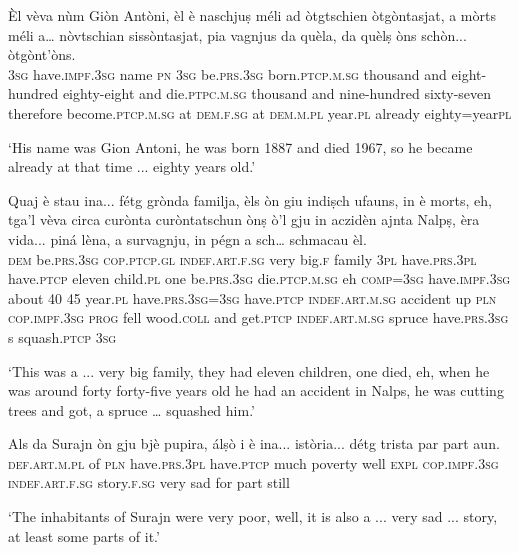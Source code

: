 \begin{linenumbers}
\gll  Èl vèva nùm Giòn Antòni, èl è naschjuṣ méli ad òtgtschien òtgòntasjat, a mòrts méli a… nòvtschian sissòntasjat, pia vagnjus da quèla, da quèlṣ òns schòn... òtgònt’òns.  \\
     \textsc{3sg} have.\textsc{impf.3sg} name \textsc{pn} \textsc{} \textsc{3sg} be.\textsc{prs.3sg} born.\textsc{ptcp.m.sg} thousand and eight-hundred eighty-eight and die.\textsc{ptpc.m.sg} thousand and nine-hundred sixty-seven therefore become.\textsc{ptcp.m.sg} at \textsc{dem.f.sg} at \textsc{dem.m.pl} year.\textsc{pl} already eighty=year\textsc{pl} \\
\end{linenumbers}
\medskip
\glt `His name was Gion Antoni, he was born 1887 and died 1967, so he became already at that time ... eighty years old.'
\medskip

\begin{linenumbers}
\gll Quaj è stau ina... fétg grònda familja, èls òn giu indiṣch ufauns, in è morts, eh, tga’l vèva circa curònta curòntatschun ònṣ ò'l gju in aczidèn ajnta Nalpṣ, èra vida... piná lèna, a  survagnju, in pégn a sch… schmacau èl.   \\
  \textsc{dem}  be.\textsc{prs.3sg}  \textsc{cop.ptcp.gl}  \textsc{indef.art.f.sg} very big.\textsc{f} family  \textsc{3pl} have.\textsc{prs.3pl} have.\textsc{ptcp} eleven child.\textsc{pl} one be.\textsc{prs.3sg} die.\textsc{ptcp.m.sg} eh \textsc{comp=3sg} have.\textsc{impf.3sg} about 40 45 year.\textsc{pl} have.\textsc{prs.3sg=3sg} have.\textsc{ptcp} \textsc{indef.art.m.sg} accident up \textsc{pln} \textsc{cop.impf.3sg} \textsc{prog} fell wood.\textsc{coll} and get.\textsc{ptcp} \textsc{indef.art.m.sg} spruce have.\textsc{prs.3sg} s squash.\textsc{ptcp} \textsc{3sg} \\
\end{linenumbers}
\medskip
\glt `This was a ... very big family, they had eleven children, one died, eh, when he was around forty forty-five years old he had an accident in Nalps, he was cutting trees and got, a spruce … squashed him.'
\medskip

\begin{linenumbers}
\gll Als da Surajn òn gju bjè pupira, álṣò i è ina... istòria... détg trista par part aun.   \\
    \textsc{def.art.m.pl} of \textsc{pln} have.\textsc{prs.3pl} have.\textsc{ptcp} much poverty well \textsc{expl} \textsc{cop.impf.3sg} \textsc{indef.art.f.sg} story.\textsc{f.sg} very sad for part still \\
\end{linenumbers}
\medskip
\glt `The inhabitants of Surajn were very poor, well, it is also a ... very sad ... story, at least some parts of it.'
\medskip

